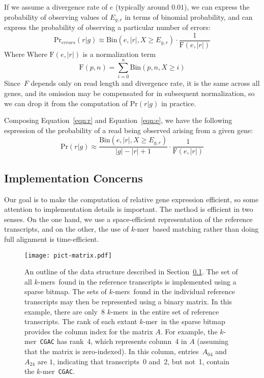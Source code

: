 \documentclass{bioinfo}
\newcommand{\kmer}{$k$-mer{}}
\newcommand{\kmers}{$k$-mers{}}
\newcommand{\dna}[1]{\hbox{\small \texttt{\uppercase{#1}}}}
\begin{document}
If we assume a divergence rate of $e$ (typically around $0.01$),
we can express the probability of observing values of $E_{g,r}$ in terms of binomial
probability, and can express the probability of observing a particular number of errors:
\begin{equation}\label{eqn:e}
\textrm{Pr}_{\textit{errors}}(r|g) \approx \textrm{Bin}(e, |r|, X \ge E_{g,r}) \cdot
	\frac{1}{\textrm{F}(e, |r|)}
\end{equation}
Where
Where $\textrm{F}(e, |r|)$ is a normalization term
$$
	\textrm{F}(p, n) = \sum\limits_{i=0}^{n} \textrm{Bin}(p, n, X \ge i)
$$
Since~$F$ depends only on read length and divergence rate, it is the same across all genes,
and its omission may be compensated for in subsequent normalization,
so we can drop it from the computation of $\textrm{Pr}(r|g)$ in practice.


Composing Equation~\ref{eqn:r} and Equation~\ref{eqn:e},
we have the following espression of the probability of a
read being observed arising from a given gene:
\begin{equation}\label{eqn:rg}
\textrm{Pr}(r|g) \approx \frac{\textrm{Bin}(e, |r|, X \ge E_{g,r})}{|g| - |r| + 1} \cdot
	\frac{1}{\textrm{F}(e, |r|)}
\end{equation}

\subsection{Implementation Concerns}\label{sect:implementation}

Our goal is to make the computation of relative gene expression efficient,
so some attention to implementation details is important.
The method is efficient in two senses. On the one hand, we use a space-efficient
representation of the reference transcripts, and on the other, the use of \kmer\ based
matching rather than doing full alignment is time-efficient.

\begin{figure}
\begin{center}
\texttt{[image: pict-matrix.pdf]}
\end{center}
\caption{An outline of the data structure described in
Section~\ref{sect:implementation}.
The set of all \kmers\ found in the reference transcripts is implemented
using a sparse bitmap.
The sets of \kmers\ found in the individual reference transcripts may
then be represented using a binary matrix.
In this example, there are only~8 \kmers\ in the entire set of reference
transcripts.
The rank of each extant \kmer\ in the sparse bitmap provides the column index
for the matrix $A$.
For example, the \kmer\ \dna{cgac} has rank~4, which represents column~4
in $A$ (assuming that the matrix is zero-indexed).
In this column, entries~$A_{04}$ and~$A_{24}$ are $1$, indicating that
transcripts~0 and~2, but not~1, contain the \kmer\ \dna{cgac}.
}
\label{fig:matrix}
\end{figure}
\end{document}
